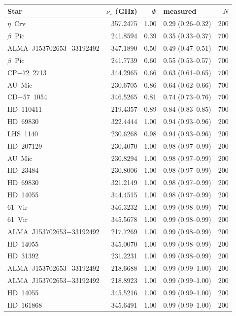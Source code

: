 \begin{tabular}{@{}l@{~~}r@{~~}r@{~~}l@{~~}r@{}}
\hline
Star & $\nu_\star$ (GHz) & $\Phi$ & measured & $N$ \\
\hline
$\eta$~Crv & 357.2475 & 1.00 & 0.29 (0.26--0.32) & 200 \\
$\beta$~Pic & 241.8594 & 0.39 & 0.35 (0.33--0.37) & 700 \\
ALMA~J153702653$-$33192492 & 347.1890 & 0.50 & 0.49 (0.47--0.51) & 700 \\
$\beta$~Pic & 241.7739 & 0.60 & 0.55 (0.53--0.57) & 700 \\
CP$-$72~2713 & 344.2965 & 0.66 & 0.63 (0.61--0.65) & 700 \\
AU~Mic & 230.6705 & 0.86 & 0.64 (0.62--0.66) & 700 \\
CD$-$57~1054 & 346.5265 & 0.81 & 0.74 (0.73--0.76) & 700 \\
HD~110411 & 219.4357 & 0.89 & 0.84 (0.83--0.85) & 700 \\
HD~69830 & 322.4444 & 1.00 & 0.94 (0.93--0.96) & 200 \\
LHS~1140 & 230.6268 & 0.98 & 0.94 (0.93--0.96) & 200 \\
HD~207129 & 230.4070 & 1.00 & 0.98 (0.97--0.99) & 200 \\
AU~Mic & 230.8294 & 1.00 & 0.98 (0.97--0.99) & 200 \\
HD~23484 & 230.8006 & 1.00 & 0.98 (0.97--0.99) & 200 \\
HD~69830 & 321.2149 & 1.00 & 0.98 (0.97--0.99) & 200 \\
HD~14055 & 344.4515 & 1.00 & 0.98 (0.97--0.99) & 200 \\
61~Vir & 346.3232 & 1.00 & 0.99 (0.98--0.99) & 700 \\
61~Vir & 345.5678 & 1.00 & 0.99 (0.98--0.99) & 200 \\
ALMA~J153702653$-$33192492 & 217.7269 & 1.00 & 0.99 (0.98--0.99) & 200 \\
HD~14055 & 345.0070 & 1.00 & 0.99 (0.98--0.99) & 200 \\
HD~31392 & 231.2231 & 1.00 & 0.99 (0.98--0.99) & 200 \\
ALMA~J153702653$-$33192492 & 218.6688 & 1.00 & 0.99 (0.99--1.00) & 200 \\
ALMA~J153702653$-$33192492 & 218.8923 & 1.00 & 0.99 (0.99--1.00) & 200 \\
HD~14055 & 345.5216 & 1.00 & 0.99 (0.99--1.00) & 200 \\
HD~161868 & 345.6491 & 1.00 & 0.99 (0.99--1.00) & 200 \\

\end{tabular}
